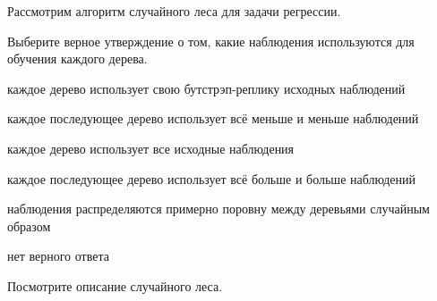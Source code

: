 
\begin{question}
Рассмотрим алгоритм случайного леса для задачи регрессии.

Выберите верное утверждение о том, какие наблюдения используются для обучения каждого дерева.
\begin{answerlist}
  \item каждое дерево использует свою бутстрэп-реплику исходных наблюдений
  \item каждое последующее дерево использует всё меньше и меньше наблюдений
  \item каждое дерево использует все исходные наблюдения
  \item каждое последующее дерево использует всё больше и больше наблюдений
  \item наблюдения распределяются примерно поровну между деревьями случайным образом
  \item нет верного ответа
\end{answerlist}
\end{question}

\begin{solution}
Посмотрите описание случайного леса.
\end{solution}

